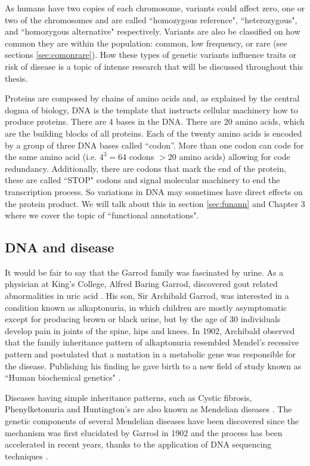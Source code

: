 As humans have two copies of each chromosome, variants could affect zero, one or two of the chromosomes and are called ``homozygous reference", ``heterozygous", and ``homozygous alternative" respectively. Variants are also be classified on how common they are within the population: common, low frequency, or rare (see sections \ref{sec:comonrare}). How these types of genetic variants influence traits or risk of disease is a topic of intense research that will be discussed throughout this thesis.

Proteins are composed by chains of amino acids and, as explained by the central dogma of biology,  DNA is the template that instructs cellular machinery how to produce proteins. There are 4 bases in the DNA. There are 20 amino acids, which are the building blocks of all proteins. Each of the twenty amino acids is encoded by a group of three DNA bases called ``codon''. More than one codon can code for the same amino acid (i.e. $4^3=64$ codons $ > 20 $ amino acids) allowing for code redundancy. Additionally, there are codons that mark the end of the protein, these are called ``STOP" codons and signal molecular machinery to end the transcription process. So variations in DNA may sometimes have direct effects on the protein product. We will talk about this in section \ref{sec:funann} and Chapter 3 where we cover the topic of ``functional annotations".

\subsection{DNA and disease}

It would be fair to say that the Garrod family was fascinated by urine. As a physician at King’s College, Alfred Baring Garrod, discovered gout related abnormalities in uric acid \cite{kennedy2001}. His son, Sir Archibald Garrod, was interested in a condition known as alkaptonuria, in which children are mostly asymptomatic except for producing brown or black urine, but by the age of 30 individuals develop pain in joints of the spine, hips and knees. In 1902, Archibald observed that the family inheritance pattern of alkaptonuria resembled Mendel’s recessive pattern and postulated that a mutation in a metabolic gene was responsible for the disease. Publishing his finding he gave birth to a new field of study known as ``Human biochemical genetics" \cite{kennedy2001}.

Diseases having simple inheritance patterns, such as Cystic fibrosis, Phenylketonuria and Huntington's are also known as Mendelian diseases \cite{kennedy2001}. The genetic components of several Mendelian diseases have been discovered since the mechanism was first elucidated by Garrod in 1902 and the process has been accelerated in recent years, thanks to the application of DNA sequencing techniques \cite{bamshad2011exome}.

